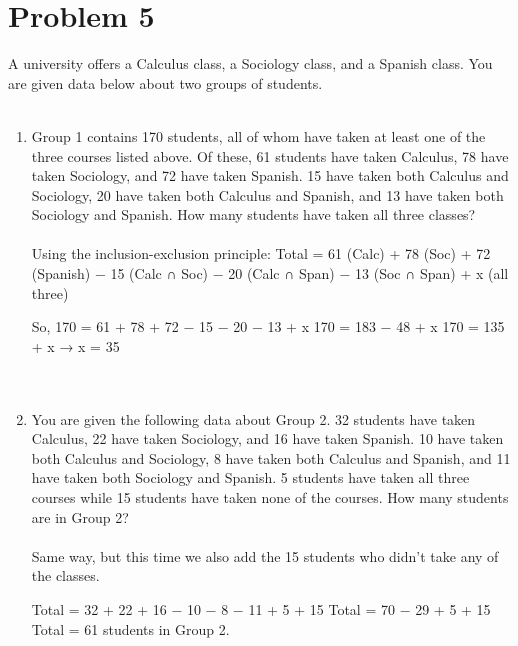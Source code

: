 \documentclass{amsart}
\theoremstyle{definition}
\theoremstyle{Exercise}
\theoremstyle{remark}
\theoremstyle{rule}
\numberwithin{equation}{section}
\begin{document}
 \newpage


\section*{Problem 5}

A university offers a Calculus class, a Sociology class, and a Spanish class. You are given data below about two groups of students.\\\\
     \begin{enumerate}[label=(\roman*)]
     \item Group 1 contains 170 students, all of whom have taken at least one of the three courses listed above. Of these, 61 students have taken Calculus, 78 have taken Sociology, and 72 have taken Spanish. 15 have taken both Calculus and Sociology, 20 have taken both Calculus and Spanish, and 13 have taken both Sociology and Spanish. How many students have taken all three classes?\\\\

Using the inclusion-exclusion principle:
Total = 61 (Calc) + 78 (Soc) + 72 (Spanish)  
− 15 (Calc ∩ Soc) − 20 (Calc ∩ Span) − 13 (Soc ∩ Span)  
+ x (all three)

So,  
170 = 61 + 78 + 72 − 15 − 20 − 13 + x  
170 = 183 − 48 + x  
170 = 135 + x → x = 35\\
\\\\
   
\item You are given the following data about Group 2. 32 students have taken Calculus, 22 have taken Sociology, and 16 have taken Spanish. 10 have taken both Calculus and Sociology, 8 have taken both Calculus and Spanish, and 11 have taken both Sociology and Spanish. 5 students have taken all three courses while 15 students have taken none of the courses. How many students are in Group 2?\\\\

Same way, but this time we also add the 15 students who didn’t take any of the classes.

Total = 32 + 22 + 16 − 10 − 8 − 11 + 5 + 15  
Total = 70 − 29 + 5 + 15  
Total = 61 students in Group 2.\\
         \end{enumerate}
 \newpage
\end{document}
